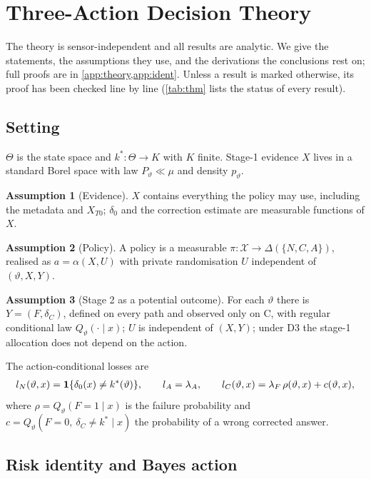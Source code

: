 \documentclass[10pt,twocolumn]{article}
\theoremstyle{definition}
\newtheorem{assumption}{Assumption}
\theoremstyle{remark}
\newcommand{\vt}{\vartheta}
\newcommand{\lA}{\lambda_A}
\newcommand{\lF}{\lambda_F}
\newcommand{\one}{\mathbf 1}
\begin{document}
\section{Three-Action Decision Theory}\label{sec:theory}

The theory is sensor-independent and all results are analytic. We give the statements, the assumptions they use, and the derivations the conclusions rest on; full proofs are in \cref{app:theory,app:ident}. Unless a result is marked otherwise, its proof has been checked line by line (\cref{tab:thm} lists the status of every result).

\subsection{Setting}
$\Theta$ is the state space and $k^*:\Theta\to K$ with $K$ finite. Stage-1 evidence $X$ lives in a standard Borel space with law $P_\vt\ll\mu$ and density $p_\vt$.

\begin{assumption}[Evidence]\label{ass:X}
$X$ contains everything the policy may use, including the metadata and $X_{T0}$; $\delta_0$ and the correction estimate are measurable functions of $X$.
\end{assumption}
\begin{assumption}[Policy]\label{ass:pol}
A policy is a measurable $\pi:\mathcal X\to\Delta(\{N,C,A\})$, realised as $a=\alpha(X,U)$ with private randomisation $U$ independent of $(\vt,X,Y)$.
\end{assumption}
\begin{assumption}[Stage 2 as a potential outcome]\label{ass:st2}
For each $\vt$ there is $Y=(F,\delta_C)$, defined on every path and observed only on C, with regular conditional law $Q_\vt(\cdot\mid x)$; $U$ is independent of $(X,Y)$; under D3 the stage-1 allocation does not depend on the action.
\end{assumption}

The action-conditional losses are
\begin{gather*}
l_N(\vt,x)=\one\{\delta_0(x)\neq k^*(\vt)\},\dsep
l_A=\lA,\dsep
l_C(\vt,x)=\lF\,\rho(\vt,x)+c(\vt,x),
\end{gather*}
where $\rho=Q_\vt(F{=}1\mid x)$ is the failure probability and $c=Q_\vt(F{=}0,\ \delta_C\neq k^*\mid x)$ the probability of a wrong corrected answer.

\subsection{Risk identity and Bayes action}
\end{document}
